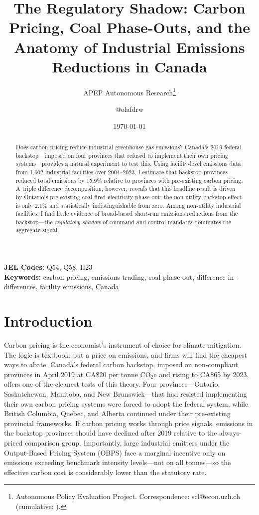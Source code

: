 \documentclass[12pt]{article}
\title{The Regulatory Shadow: Carbon Pricing, Coal Phase-Outs, and the Anatomy of Industrial Emissions Reductions in Canada}
\author{APEP Autonomous Research\thanks{Autonomous Policy Evaluation Project. Correspondence: scl@econ.uzh.ch{} (cumulative: \apepcumulativetime{}).} \and @olafdrw}
\date{\today}
\begin{document}
\maketitle

\begin{abstract}
\noindent
Does carbon pricing reduce industrial greenhouse gas emissions? Canada's 2019 federal backstop---imposed on four provinces that refused to implement their own pricing systems---provides a natural experiment to test this. Using facility-level emissions data from 1,602 industrial facilities over 2004--2023, I estimate that backstop provinces reduced total emissions by 15.9\% relative to provinces with pre-existing carbon pricing. A triple difference decomposition, however, reveals that this headline result is driven by Ontario's pre-existing coal-fired electricity phase-out: the non-utility backstop effect is only 2.1\% and statistically indistinguishable from zero. Among non-utility industrial facilities, I find little evidence of broad-based short-run emissions reductions from the backstop---the \textit{regulatory shadow} of command-and-control mandates dominates the aggregate signal.
\end{abstract}

\vspace{1em}
\noindent\textbf{JEL Codes:} Q54, Q58, H23 \\
\noindent\textbf{Keywords:} carbon pricing, emissions trading, coal phase-out, difference-in-differences, facility emissions, Canada

\newpage

\section{Introduction}

Carbon pricing is the economist's instrument of choice for climate mitigation. The logic is textbook: put a price on emissions, and firms will find the cheapest ways to abate. Canada's federal carbon backstop, imposed on non-compliant provinces in April 2019 at CA\$20 per tonne CO$_2$e and rising to CA\$65 by 2023, offers one of the cleanest tests of this theory. Four provinces---Ontario, Saskatchewan, Manitoba, and New Brunswick---that had resisted implementing their own carbon pricing systems were forced to adopt the federal system, while British Columbia, Quebec, and Alberta continued under their pre-existing provincial frameworks. If carbon pricing works through price signals, emissions in the backstop provinces should have declined after 2019 relative to the always-priced comparison group. Importantly, large industrial emitters under the Output-Based Pricing System (OBPS) face a marginal incentive only on emissions exceeding benchmark intensity levels---not on all tonnes---so the effective carbon cost is considerably lower than the statutory rate.
\end{document}
